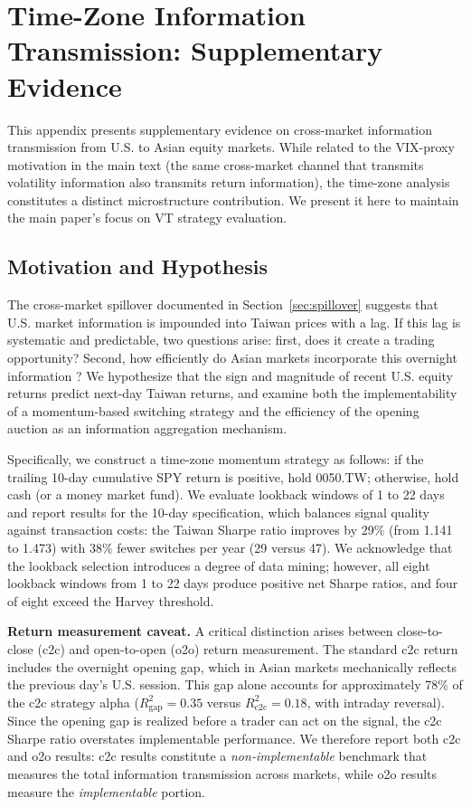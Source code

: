 \appendix

\section{Time-Zone Information Transmission: Supplementary Evidence}
\label{app:tz}

This appendix presents supplementary evidence on cross-market information transmission from U.S. to Asian equity markets. While related to the VIX-proxy motivation in the main text (the same cross-market channel that transmits volatility information also transmits return information), the time-zone analysis constitutes a distinct microstructure contribution. We present it here to maintain the main paper's focus on VT strategy evaluation.

\subsection{Motivation and Hypothesis}

The cross-market spillover documented in Section~\ref{sec:spillover} suggests that U.S. market information is impounded into Taiwan prices with a lag. If this lag is systematic and predictable, two questions arise: first, does it create a trading opportunity? Second, how efficiently do Asian markets incorporate this overnight information \citep{barclay2003}? We hypothesize that the sign and magnitude of recent U.S. equity returns predict next-day Taiwan returns, and examine both the implementability of a momentum-based switching strategy and the efficiency of the opening auction as an information aggregation mechanism.

Specifically, we construct a time-zone momentum strategy as follows: if the trailing 10-day cumulative SPY return is positive, hold 0050.TW; otherwise, hold cash (or a money market fund). We evaluate lookback windows of 1 to 22 days and report results for the 10-day specification, which balances signal quality against transaction costs: the Taiwan Sharpe ratio improves by 29\% (from 1.141 to 1.473) with 38\% fewer switches per year (29 versus 47). We acknowledge that the lookback selection introduces a degree of data mining; however, all eight lookback windows from 1 to 22 days produce positive net Sharpe ratios, and four of eight exceed the Harvey threshold.

\textbf{Return measurement caveat.} A critical distinction arises between close-to-close (c2c) and open-to-open (o2o) return measurement. The standard c2c return includes the overnight opening gap, which in Asian markets mechanically reflects the previous day's U.S. session. This gap alone accounts for approximately 78\% of the c2c strategy alpha ($R^2_{\text{gap}} = 0.35$ versus $R^2_{\text{c2c}} = 0.18$, with intraday reversal). Since the opening gap is realized before a trader can act on the signal, the c2c Sharpe ratio overstates implementable performance. We therefore report both c2c and o2o results: c2c results constitute a \textit{non-implementable} benchmark that measures the total information transmission across markets, while o2o results measure the \textit{implementable} portion.

